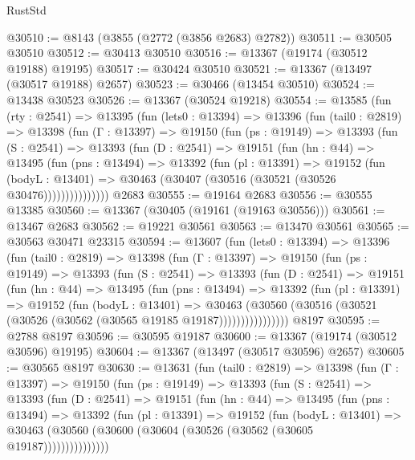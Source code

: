 \begin{lexlean}{RustStd}
\begin{coremodule}
@30510 := @8143 (@3855 (@2772 (@3856 @2683) @2782))
@30511 := @30505 @30510
@30512 := @30413 @30510
@30516 := @13367 (@19174 (@30512 @19188) @19195)
@30517 := @30424 @30510
@30521 := @13367 (@13497 (@30517 @19188) @2657)
@30523 := @30466 (@13454 @30510)
@30524 := @13438 @30523
@30526 := @13367 (@30524 @19218)
@30554 := @13585
    (fun (rty : @2541) =>
    @13395
      (fun (lets0 : @13394) =>
      @13396
        (fun (tail0 : @2819) =>
        @13398
          (fun (Γ : @13397) =>
          @19150
            (fun (ps : @19149) =>
            @13393
              (fun (S : @2541) =>
              @13393
                (fun (D : @2541) =>
                @19151
                  (fun (hn : @44) =>
                  @13495
                    (fun (pns : @13494) =>
                    @13392
                      (fun (pl : @13391) =>
                      @19152
                        (fun (bodyL : @13401) =>
                        @30463 (@30407 (@30516 (@30521 (@30526 @30476)))))))))))))))
    @2683
@30555 := @19164 @2683
@30556 := @30555 @13385
@30560 := @13367 (@30405 (@19161 (@19163 @30556)))
@30561 := @13467 @2683
@30562 := @19221 @30561
@30563 := @13470 @30561
@30565 := @30563 @30471 @23315
@30594 := @13607
    (fun (lets0 : @13394) =>
    @13396
      (fun (tail0 : @2819) =>
      @13398
        (fun (Γ : @13397) =>
        @19150
          (fun (ps : @19149) =>
          @13393
            (fun (S : @2541) =>
            @13393
              (fun (D : @2541) =>
              @19151
                (fun (hn : @44) =>
                @13495
                  (fun (pns : @13494) =>
                  @13392
                    (fun (pl : @13391) =>
                    @19152
                      (fun (bodyL : @13401) =>
                      @30463
                        (@30560
                          (@30516 (@30521 (@30526 (@30562 (@30565 @19185 @19187))))))))))))))))
    @8197
@30595 := @2788 @8197
@30596 := @30595 @19187
@30600 := @13367 (@19174 (@30512 @30596) @19195)
@30604 := @13367 (@13497 (@30517 @30596) @2657)
@30605 := @30565 @8197
@30630 := @13631
    (fun (tail0 : @2819) =>
    @13398
      (fun (Γ : @13397) =>
      @19150
        (fun (ps : @19149) =>
        @13393
          (fun (S : @2541) =>
          @13393
            (fun (D : @2541) =>
            @19151
              (fun (hn : @44) =>
              @13495
                (fun (pns : @13494) =>
                @13392
                  (fun (pl : @13391) =>
                  @19152
                    (fun (bodyL : @13401) =>
                    @30463 (@30560 (@30600 (@30604 (@30526 (@30562 (@30605 @19187)))))))))))))))

\end{coremodule}
\end{lexlean}
